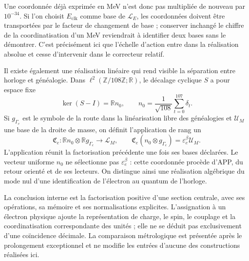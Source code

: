 Une coordonnée déjà exprimée en MeV n'est donc pas multipliée de nouveau
par \(10^{-34}\). Si l'on choisit \(E_{\mathrm{clk}}\) comme base de
\(\mathcal L_E\), les coordonnées doivent être transportées par le facteur
de changement de base ; conserver inchangé le chiffre de la coordinatisation d'un MeV
reviendrait à identifier deux bases sans le démontrer. C'est précisément ici
que l'échelle d'action entre dans la réalisation absolue et cesse
d'intervenir dans le correcteur relatif.

Il existe également une réalisation linéaire qui rend visible la séparation
entre horloge et généalogie. Dans
\(\ell^2(\mathbb Z/108\mathbb Z;\mathbb R)\), le décalage
cyclique \(S\) a pour espace fixe
\[
 \ker(S-I)=\mathbb R n_0,\qquad
 n_0=\frac1{\sqrt{108}}\sum_{t=0}^{107}\delta_t.
\]
Si \(g_{\Gamma_e}\) est le symbole de la route dans la linéarisation libre
des généalogies et \(\mathcal U_M\) une base de la droite de masse,
on définit l'application de rang un
\begin{equation}
 \mathfrak C_e:
 \mathbb R n_0\otimes\mathbb R g_{\Gamma_e}\longrightarrow\mathcal L_M,
 \qquad
 \mathfrak C_e(n_0\otimes g_{\Gamma_e})
 =\varepsilon_e^\beta\mathcal U_M.
 \label{eq:el-rango-uno}
\end{equation}
L'application réunit la factorisation précédente une fois ses bases déclarées.
Le vecteur uniforme \(n_0\) ne sélectionne pas \(\varepsilon_e^\beta\) :
cette coordonnée procède d'APP, du retour orienté et de ses lecteurs.
On distingue ainsi une réalisation algébrique du mode nul d'une
identification de l'électron au quantum de l'horloge.

La conclusion interne est la factorisation positive d'une section
centrale, avec ses opérations, sa mémoire et ses normalisations explicites.
L'assignation à un électron physique ajoute la représentation de charge, le
spin, le couplage et la coordinatisation correspondante des unités ; elle ne se
déduit pas exclusivement d'une coïncidence décimale. La comparaison
métrologique est présentée après le prolongement exceptionnel et ne modifie
les entrées d'aucune des constructions réalisées ici.




